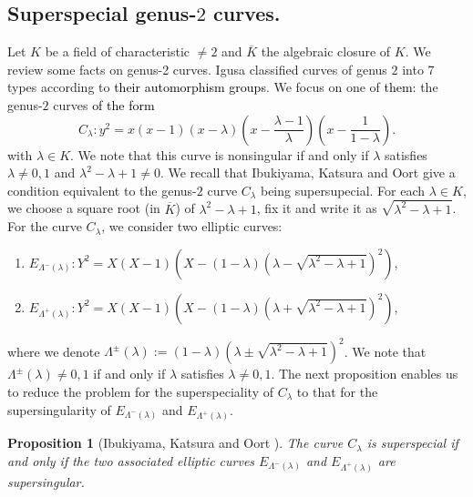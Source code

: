 \documentclass[a4paper, 11pt]{article}
\theoremstyle{plain}
\newtheorem{prop}[defn]{Proposition}
\newcommand{\?}{\textcolor{red}{??}}
\newcommand{\lm}{\lambda}
\newcommand{\Lm}{\Lambda}
\begin{document}
\subsection{Superspecial genus-$2$ curves.}
Let $K$ be a field of characteristic $\ne 2$ and $\overline K$ the algebraic closure of $K$. We review some facts on genus-2 curves. Igusa \cite{Igusa} classified curves of genus $2$ into 7 types according to \textcolor{black}{their automorphism groups}.  We focus on one of \textcolor{black}{them}: the genus-$2$ curves \textcolor{black}{of the form} 
\[
C_{\lm}:y^2=x(x-1)(x-\lm)\left(x-\frac{\lm-1}{\lm}\right) \left(x-\frac{1}{1-\lm}\right).
\]
with $\lm\in K$. We note that this curve is nonsingular if and only if $\lm$ satisfies $\lm \ne 0,1$ and $\lm^2-\lm+1\ne 0$.  We recall that Ibukiyama, Katsura and Oort \cite{IKO02} give a condition equivalent to the genus-$2$ curve $C_{\lm}$ being supersupecial.
For each $\lambda \in K$, we choose a square root (in $\overline K$) of $\lambda^2-\lambda+1$, fix it and write it as $\sqrt{\lambda^2-\lambda+1}$.
For the curve $C_{\lm}$, we consider two elliptic curves:
\begin{enumerate}

\item[] $E_{\Lambda^{-}(\lm)}: Y^2=X(X-1)(X-(1-\lambda)(\lambda-\sqrt{{\lm}^2-\lambda+1})^2)$,

\item[] $E_{{\Lambda}^{+}(\lm)}: Y^2=X(X-1)(X-(1-\lambda)(\lambda+\sqrt{{\lm}^2-\lambda+1})^2)$,
\end{enumerate}
where we denote 
$
\Lm^{\pm}(\lm):= (1-\lambda)(\lambda\pm\sqrt{{\lm}^2-\lambda+1})^2$.  We note that $\Lm^{\pm}(\lm)\ne 0,1$ if and only if $\lm$ satisfies $\lm\ne0,1$.  The next proposition enables us to reduce the problem for the superspeciality of $C_\lm$ to that for the supersingularity of $E_{\Lambda^{-}(\lm)}$ and $ E_{{\Lambda}^{+}(\lm)}$.

\begin{prop}[Ibukiyama, Katsura and Oort {\cite[Lemma 1.1 (),\ Proposition 1.3 (), ()]{IKO02}}]
\label{arigataya}
The curve $C_{\lm}$ is superspecial if and only if the two associated elliptic curves $E_{\Lambda^{-}(\lm)}$ and $ E_{{\Lambda}^{+}(\lm)}$ are supersingular.
\end{prop}
\end{document}
